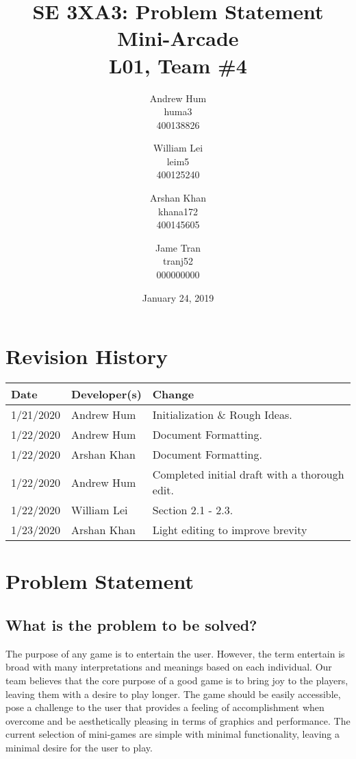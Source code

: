 \documentclass{article}
\title{SE 3XA3: Problem Statement \\ Mini-Arcade \\{\large L01, Team \#4}}
\author{Andrew Hum \\ huma3 \\ 400138826 \and
		William Lei \\ leim5 \\ 400125240 \and
		Arshan Khan \\ khana172 \\ 400145605 \and
		Jame Tran \\ tranj52 \\ 000000000
}
\date{January 24, 2019}
\begin{document}
\maketitle
\newpage

\tableofcontents
\newpage



\begin{table}[hp]
\section{Revision History} \label{TblRevisionHistory}
\begin{tabularx}{\textwidth}{llX}
\hline
\textbf{Date} & \textbf{Developer(s)} & \textbf{Change}\\
\hline
1/21/2020 & Andrew Hum & Initialization \& Rough Ideas.\\
\hline
1/22/2020 & Andrew Hum  & Document Formatting.\\
\hline
1/22/2020 & Arshan Khan & Document Formatting.\\
\hline
1/22/2020 & Andrew Hum & Completed initial draft with a thorough edit. \\
\hline
1/22/2020 & William Lei & Section 2.1 - 2.3.\\
\hline
1/23/2020 & Arshan Khan & Light editing to improve brevity\\
\hline
\end{tabularx}
\end{table}

\newpage

\section{Problem Statement}
\subsection{What is the problem to be solved?}
The purpose of any game is to entertain the user. However, the term entertain is broad with many interpretations and meanings based on each individual. Our team believes that the core purpose of a good game is to bring joy to the players, leaving them with a desire to play longer. The game should be easily accessible, pose a challenge to the user that provides a feeling of accomplishment when overcome and be aesthetically pleasing in terms of graphics and performance. The current selection of mini-games are simple with minimal functionality, leaving a minimal desire for the user to play.
\end{document}
